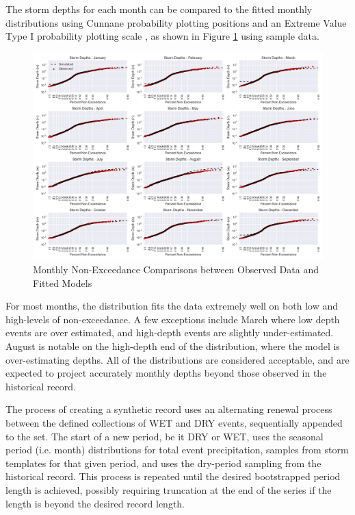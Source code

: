 \documentclass[11pt]{article} %
\begin{document}
The storm depths for each month can be compared to the fitted monthly distributions using Cunnane probability plotting positions \cite{Cunnane1978} and an Extreme Value Type I probability plotting scale \cite{Santner1973}, as shown in Figure \ref{Percentile_Totals} using sample data. 

\begin{figure}%
\center
\noindent\includegraphics[scale=.4]{./Figures/Percentile_Fits} 
\caption[]{Monthly Non-Exceedance Comparisons between Observed Data and Fitted Models}
\label{Percentile_Totals}	
\end{figure}

For most months, the distribution fits the data extremely well on both low and high-levels of non-exceedance. A few exceptions include March where low depth events are over estimated, and high-depth events are slightly under-estimated. August is notable on the high-depth end of the distribution, where the model is over-estimating depths. All of the distributions are considered acceptable, and are expected to project accurately monthly depths beyond those observed in the historical record.

The process of creating a synthetic record uses an alternating renewal process between the defined collections of WET and DRY events, sequentially appended to the set. The start of a new period, be it DRY or WET, uses the seasonal period (i.e. month) distributions for total event precipitation, samples from storm templates for that given period, and uses the dry-period sampling from the historical record. This process is repeated until the desired bootstrapped period length is achieved, possibly requiring truncation at the end of the series if the length is beyond the desired record length.
\end{document}
